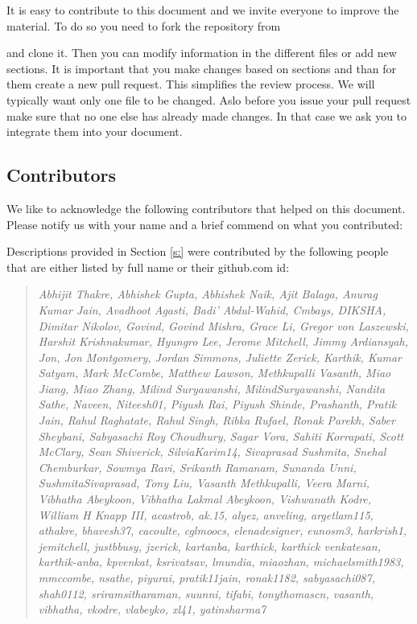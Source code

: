 It is easy to contribute to this document and we invite everyone to
improve the material. To do so you need to fork the repository from 


and clone it. Then you can modify information in the different files
or add new sections. It is important that you make changes based on
sections and than for them create a new pull request. This simplifies
the review process. We will typically want only one file to be
changed. Aslo before you issue your pull request make sure that no one
else has already made changes. In that case we ask you to integrate
them into your document.



\subsection{Contributors}

We like to acknowledge the following contributors that helped on this
document. Please notify us with your name and a brief commend on what
you contributed:

Descriptions provided in Section \ref{s:} were contributed by the
following people that are either listed by full name or their
github.com id:

\begin{quotation}{\em
Abhijit Thakre, Abhishek Gupta, Abhishek Naik, Ajit Balaga, Anurag
Kumar Jain, Avadhoot Agasti, Badi' Abdul-Wahid, Cmbays, DIKSHA,
Dimitar Nikolov, Govind, Govind Mishra, Grace Li, Gregor von
Laszewski, Harshit Krishnakumar, Hyungro Lee, Jerome Mitchell, Jimmy
Ardiansyah, Jon, Jon Montgomery, Jordan Simmons, Juliette Zerick,
Karthik, Kumar Satyam, Mark McCombe, Matthew Lawson, Methkupalli
Vasanth, Miao Jiang, Miao Zhang, Milind Suryawanshi,
MilindSuryawanshi, Nandita Sathe, Naveen, Niteesh01, Piyush Rai,
Piyush Shinde, Prashanth, Pratik Jain, Rahul Raghatate, Rahul Singh,
Ribka Rufael, Ronak Parekh, Saber Sheybani, Sabyasachi Roy Choudhury,
Sagar Vora, Sahiti Korrapati, Scott McClary, Sean Shiverick,
SilviaKarim14, Sivaprasad Sushmita, Snehal Chemburkar, Sowmya Ravi,
Srikanth Ramanam, Sunanda Unni, SushmitaSivaprasad, Tony Liu, Vasanth
Methkupalli, Veera Marni, Vibhatha Abeykoon, Vibhatha Lakmal Abeykoon,
Vishwanath Kodre, William H Knapp III, acastrob, ak.15, alyez,
anveling, argetlam115, athakre, bhavesh37, cacoulte, cglmoocs,
elenadesigner, eunosm3, harkrish1, jemitchell, justbbusy, jzerick,
kartanba, karthick, karthick venkatesan, karthik-anba, kpvenkat,
ksrivatsav, lmundia, miaozhan, michaelsmith1983, mmccombe, nsathe,
piyurai, pratik11jain, ronak1182, sabyasachi087,
shah0112, sriramsitharaman, suunni, tifabi, tonythomascn, vasanth,
vibhatha, vkodre, vlabeyko, xl41, yatinsharma7
}\end{quotation}


